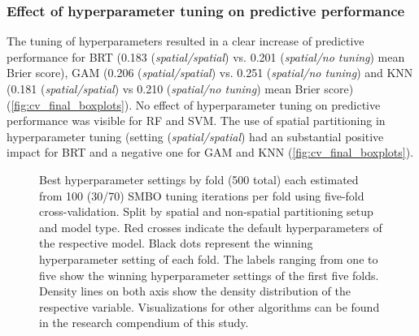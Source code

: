 \documentclass[review]{elsarticle}
\begin{document}
\subsubsection{Effect of hyperparameter tuning on predictive performance}
The tuning of hyperparameters resulted in a clear increase of predictive performance for BRT (0.183 (\emph{spatial/spatial}) vs. 0.201 (\emph{spatial/no tuning}) mean Brier score), GAM (0.206 (\emph{spatial/spatial}) vs. 0.251 (\emph{spatial/no tuning}) and KNN (0.181 (\emph{spatial/spatial}) vs 0.210 (\emph{spatial/no tuning}) mean Brier score) (\autoref{fig:cv_final_boxplots}).
No effect of hyperparameter tuning on predictive performance was visible for RF and SVM.
The use of spatial partitioning in hyperparameter tuning (setting (\emph{spatial/spatial}) had an substantial positive impact for BRT and a negative one for GAM and KNN (\autoref{fig:cv_final_boxplots}).

\begin{figure} [H]
	\begin{center}
		\caption[]{Best hyperparameter settings by fold (500 total) each estimated from 100 (30/70) SMBO tuning iterations per fold using five-fold cross-validation. 
		Split by spatial and non-spatial partitioning setup and model type.
			Red crosses indicate the default hyperparameters of the respective model.
			Black dots represent the winning hyperparameter setting of each fold.
			The labels ranging from one to five show the winning hyperparameter settings of the first five folds.
			Density lines on both axis show the density distribution of the respective variable.
			Visualizations for other algorithms can be found in the research compendium of this study.}
		\label{fig:best_parameter_combs}
	\end{center}
\end{figure}
\end{document}
